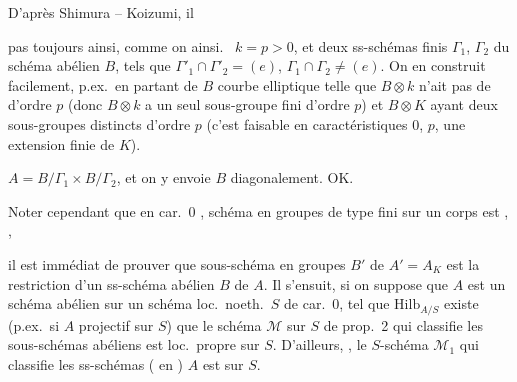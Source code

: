 \documentclass[11pt,a4paper]{article}
\begin{document}
D'après Shimura -- Koizumi, il 

pas toujours ainsi, comme on  ainsi. 
\struck{\ill{}} \ $k = p > 0$, et 
deux ss-schémas finis $\Gamma_1$, $\Gamma_2$ du schéma abélien
 $B$, tels que
$\Gamma'_1 \cap \Gamma'_2 = (e)$, $\Gamma_1 \cap \Gamma_2 \neq (e)$. On en
construit facilement, p.ex.\ en partant de $B$ courbe elliptique telle que
$B \otimes k$ n'ait pas de  d'ordre $p$ (donc
$B \otimes k$ a un seul sous-groupe fini d'ordre $p$) et $B \otimes K$
ayant deux sous-groupes distincts d'ordre $p$ (c'est faisable
\struck{\ill{}} en  caractéristiques $0$, $p$,
\struck{\ill{}}  \struck{\ill{}} \ill{} une
extension finie de $K$).

 $A = B/\Gamma_1 \times B/\Gamma_2$, et on y envoie $B$
diagonalement. OK.


Noter cependant que en car.~$0$ , 
schéma en groupes de type fini sur un corps est ,
,

il est immédiat de prouver que \struck{\ill{}} 
sous-schéma  en groupes  $B'$ de
$A' = A_K$ est la restriction d'un \struck{\ill{}} ss-schéma abélien $B$
de $A$. Il s'ensuit, si on suppose que $A$ est un schéma abélien
 sur un schéma loc.\ noeth.\ $S$ de
car.~$0$,  tel que $\mathrm{Hilb}_{A/S}$
 existe  (p.ex.\ si $A$ projectif sur $S$) que le schéma $\mathcal{M}$
sur $S$ de prop.~2  qui classifie les sous-schémas
abéliens \struck{(\ill{})} est 
loc.\ propre sur $S$. D'ailleurs, \ill{} 
\ill{}, le $S$-schéma $\mathcal{M}_1$ 
qui classifie les ss-schémas ( en
)  $A$ est
\struck{\ill{}} sur $S$. 
\end{document}
